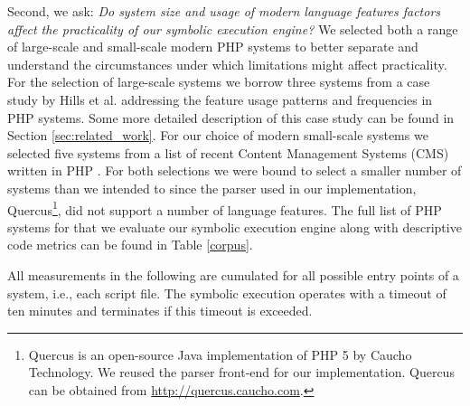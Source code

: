 \documentclass[sigconf]{acmart}
\renewcommand{\sf}[1]{\textsf{#1}}
\begin{document}
Second, we ask: \textit{Do system size and usage of modern language features
factors affect the practicality of our symbolic execution engine?} We
selected both a range of large-scale and small-scale modern PHP systems to
better separate and understand the circumstances under which limitations might affect practicality. For the selection of large-scale systems
we borrow three systems from a case study by Hills et al. \cite{hills2015variable} addressing the
feature usage patterns and frequencies in PHP systems. Some more detailed description of this
case study can be found in Section \ref{sec:related_work}. For our choice of modern small-scale systems we
selected five systems from a list of recent Content Management Systems (CMS) written in PHP \cite{codegeekz}. For both
selections we were bound to select a smaller number of systems than we intended
to since the parser used in our implementation,
\sf{Quercus}\footnote{\sf{Quercus} is an open-source Java implementation of PHP
5 by Caucho Technology. We reused the parser front-end for our implementation.
\sf{Quercus} can be obtained from \url{http://quercus.caucho.com}.}, did not
support a number of language features.
The full list of PHP systems for that we evaluate our symbolic execution engine
along with descriptive code metrics can be found in Table \ref{corpus}. 

All measurements in the following are cumulated for all possible entry points of a
system, i.e., each script file. The symbolic execution operates with a timeout
of ten minutes and terminates if this timeout is exceeded.


\end{document}
